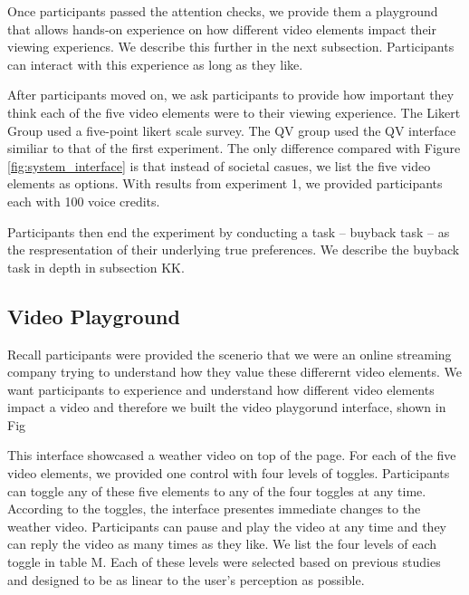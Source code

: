 Once participants passed the attention checks, we provide them a playground that allows hands-on experience on how different video elements impact their viewing experiencs. We describe this further in the next subsection. Participants can interact with this experience as long as they like. %

After participants moved on, we ask participants to provide how important they think each of the five video elements were to their viewing experience. The Likert Group used a five-point likert scale survey. The QV group used the QV interface similiar to that of the first experiment. The only difference compared with Figure \ref{fig:system_interface} is that instead of societal casues, we list the five video elements as options. With results from experiment 1, we provided participants each with 100 voice credits.

Participants then end the experiment by conducting a task -- buyback task -- as the respresentation of their underlying true preferences. We describe the buyback task in depth in subsection KK.


\subsection{Video Playground}
Recall participants were provided the scenerio that we were an online streaming company trying to understand how they value these differernt video elements.
We want participants to experience and understand how different video elements impact a video
and therefore we built the video playgorund interface, shown in Fig %

This interface showcased a weather video on top of the page.
For each of the five video elements,
we provided one control with four levels of toggles.
Participants can toggle any of these five elements to any of the four toggles at any time.
According to the toggles, the interface presentes immediate changes to the weather video.
Participants can pause and play the video at any time and they can reply the video as many times as they like.
We list the four levels of each toggle in table M. 
Each of these levels were selected based on previous studies and designed to be as linear to the user's perception as possible. 

